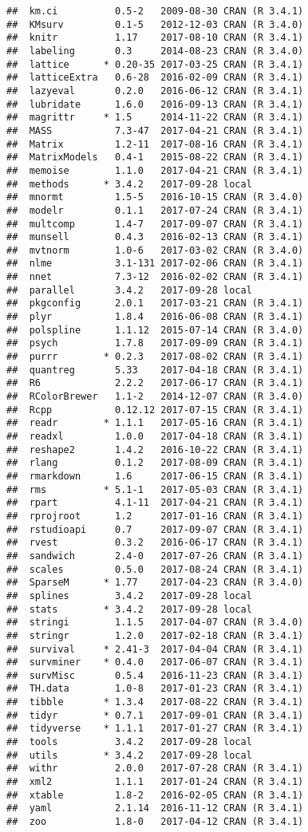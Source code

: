 \documentclass[]{book}
\theoremstyle{definition}
\theoremstyle{definition}
\theoremstyle{definition}
\theoremstyle{remark}
\begin{document}
\begin{verbatim}
##  km.ci          0.5-2   2009-08-30 CRAN (R 3.4.1)
##  KMsurv         0.1-5   2012-12-03 CRAN (R 3.4.0)
##  knitr          1.17    2017-08-10 CRAN (R 3.4.1)
##  labeling       0.3     2014-08-23 CRAN (R 3.4.0)
##  lattice      * 0.20-35 2017-03-25 CRAN (R 3.4.1)
##  latticeExtra   0.6-28  2016-02-09 CRAN (R 3.4.1)
##  lazyeval       0.2.0   2016-06-12 CRAN (R 3.4.1)
##  lubridate      1.6.0   2016-09-13 CRAN (R 3.4.1)
##  magrittr     * 1.5     2014-11-22 CRAN (R 3.4.1)
##  MASS           7.3-47  2017-04-21 CRAN (R 3.4.1)
##  Matrix         1.2-11  2017-08-16 CRAN (R 3.4.1)
##  MatrixModels   0.4-1   2015-08-22 CRAN (R 3.4.1)
##  memoise        1.1.0   2017-04-21 CRAN (R 3.4.1)
##  methods      * 3.4.2   2017-09-28 local         
##  mnormt         1.5-5   2016-10-15 CRAN (R 3.4.0)
##  modelr         0.1.1   2017-07-24 CRAN (R 3.4.1)
##  multcomp       1.4-7   2017-09-07 CRAN (R 3.4.1)
##  munsell        0.4.3   2016-02-13 CRAN (R 3.4.1)
##  mvtnorm        1.0-6   2017-03-02 CRAN (R 3.4.0)
##  nlme           3.1-131 2017-02-06 CRAN (R 3.4.1)
##  nnet           7.3-12  2016-02-02 CRAN (R 3.4.1)
##  parallel       3.4.2   2017-09-28 local         
##  pkgconfig      2.0.1   2017-03-21 CRAN (R 3.4.1)
##  plyr           1.8.4   2016-06-08 CRAN (R 3.4.1)
##  polspline      1.1.12  2015-07-14 CRAN (R 3.4.0)
##  psych          1.7.8   2017-09-09 CRAN (R 3.4.1)
##  purrr        * 0.2.3   2017-08-02 CRAN (R 3.4.1)
##  quantreg       5.33    2017-04-18 CRAN (R 3.4.1)
##  R6             2.2.2   2017-06-17 CRAN (R 3.4.1)
##  RColorBrewer   1.1-2   2014-12-07 CRAN (R 3.4.0)
##  Rcpp           0.12.12 2017-07-15 CRAN (R 3.4.1)
##  readr        * 1.1.1   2017-05-16 CRAN (R 3.4.1)
##  readxl         1.0.0   2017-04-18 CRAN (R 3.4.1)
##  reshape2       1.4.2   2016-10-22 CRAN (R 3.4.1)
##  rlang          0.1.2   2017-08-09 CRAN (R 3.4.1)
##  rmarkdown      1.6     2017-06-15 CRAN (R 3.4.1)
##  rms          * 5.1-1   2017-05-03 CRAN (R 3.4.1)
##  rpart          4.1-11  2017-04-21 CRAN (R 3.4.1)
##  rprojroot      1.2     2017-01-16 CRAN (R 3.4.1)
##  rstudioapi     0.7     2017-09-07 CRAN (R 3.4.1)
##  rvest          0.3.2   2016-06-17 CRAN (R 3.4.1)
##  sandwich       2.4-0   2017-07-26 CRAN (R 3.4.1)
##  scales         0.5.0   2017-08-24 CRAN (R 3.4.1)
##  SparseM      * 1.77    2017-04-23 CRAN (R 3.4.0)
##  splines        3.4.2   2017-09-28 local         
##  stats        * 3.4.2   2017-09-28 local         
##  stringi        1.1.5   2017-04-07 CRAN (R 3.4.0)
##  stringr        1.2.0   2017-02-18 CRAN (R 3.4.1)
##  survival     * 2.41-3  2017-04-04 CRAN (R 3.4.1)
##  survminer    * 0.4.0   2017-06-07 CRAN (R 3.4.1)
##  survMisc       0.5.4   2016-11-23 CRAN (R 3.4.1)
##  TH.data        1.0-8   2017-01-23 CRAN (R 3.4.1)
##  tibble       * 1.3.4   2017-08-22 CRAN (R 3.4.1)
##  tidyr        * 0.7.1   2017-09-01 CRAN (R 3.4.1)
##  tidyverse    * 1.1.1   2017-01-27 CRAN (R 3.4.1)
##  tools          3.4.2   2017-09-28 local         
##  utils        * 3.4.2   2017-09-28 local         
##  withr          2.0.0   2017-07-28 CRAN (R 3.4.1)
##  xml2           1.1.1   2017-01-24 CRAN (R 3.4.1)
##  xtable         1.8-2   2016-02-05 CRAN (R 3.4.1)
##  yaml           2.1.14  2016-11-12 CRAN (R 3.4.1)
##  zoo            1.8-0   2017-04-12 CRAN (R 3.4.1)
\end{verbatim}


\end{document}
